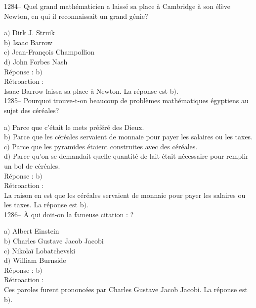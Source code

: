 ﻿\documentclass[letterpaper, 12pt]{article}
\begin{document}
1284-- Quel grand math\'ematicien a laiss\'e sa place \`a Cambridge
\`a son \'el\`eve Newton, en qui il reconnaissait un grand g\'enie?

a$)$ Dirk J. Struik \\
b$)$ Isaac Barrow \\
c$)$ Jean-Fran\c cois Champollion \\
d$)$ John Forbes Nash\\

R\'eponse : b$)$\\

R\'etroaction : \\
Isaac Barrow laissa sa place \`a Newton.
La r\'eponse est  b$)$.\\

1285-- Pourquoi trouve-t-on beaucoup de probl\`emes math\'ematiques
\'egyptiens au sujet des c\'er\'eales?

a$)$ Parce que c'\'etait le mets pr\'ef\'er\'e des Dieux. \\
b$)$ Parce que les c\'er\'eales servaient de monnaie pour payer les salaires
ou les taxes. \\
c$)$ Parce que les pyramides \'etaient construites avec des c\'er\'eales. \\
d$)$ Parce qu'on se demandait quelle quantit\'e de lait \'etait n\'ecessaire
pour remplir un bol de c\'er\'eales. \\


R\'eponse : b$)$\\

R\'etroaction : \\
La raison en est que les c\'er\'eales servaient de monnaie pour
payer les salaires ou les taxes.
La r\'eponse est  b$)$.\\

1286-- \`A qui doit-on la fameuse citation : \fg?

a$)$ Albert Einstein \\
b$)$ Charles Gustave Jacob Jacobi \\
c$)$ Nikola\"i Lobatchevski \\
d$)$ William Burnside\\

R\'eponse : b$)$\\

R\'etroaction : \\
Ces paroles furent prononc\'ees par Charles Gustave Jacob Jacobi.
La r\'eponse est  b$)$.\\
\end{document}
